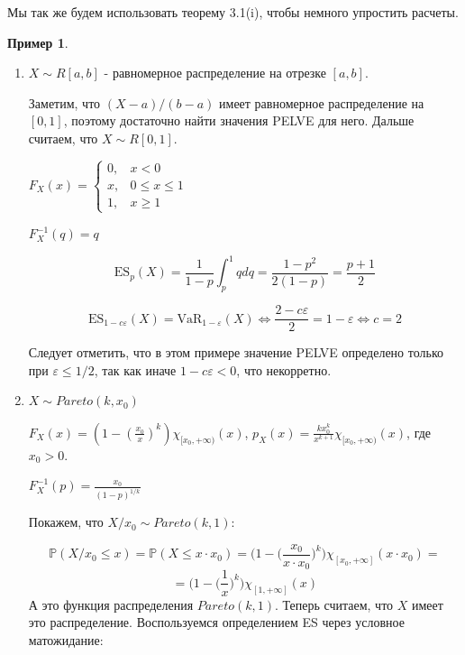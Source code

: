 \documentclass[12pt]{article}
\theoremstyle{plain}
\theoremstyle{definition}
\newtheorem{example}{Пример}[section]
\theoremstyle{remark}
\begin{document}
Мы так же будем использовать теорему 3.1(i), чтобы немного упростить расчеты. 

\begin{example}
$\text{}$
\begin{enumerate}
    \item $X \sim R[a, b]$ - равномерное распределение на отрезке $[a, b]$.

        Заметим, что $(X - a)/(b-a)$ имеет равномерное распределение на $[0,1]$, поэтому достаточно найти значения PELVE для него. Дальше считаем, что $X \sim R[0, 1]$.
    
        $F_X(x)=
        \begin{cases}
        0, &  x < 0 \\
        x, &  0 \leq x \leq 1 \\
        1, &  x \geq 1
        \end{cases}$
        
        $F_X^{-1}(q) = q$
    
        \[\text{ES}_p(X) = \frac{1}{1-p}\int_p^1qdq = \frac{1-p^2}{2(1-p)} = \frac{p+1}{2}\]
    
        \begin{equation*}
        \text{ES}_{1-c\varepsilon}(X) = \text{VaR}_{1-\varepsilon}(X) \iff \frac{2 -c\varepsilon}{2} = 1 - \varepsilon \iff c = 2
        \end{equation*}

        Следует отметить, что в этом примере значение PELVE определено только при $\varepsilon \leq 1/2$, так как иначе $1-c\varepsilon < 0$, что некорретно.

    
    
    \item $X \sim Pareto(k, x_0)$

        $F_X(x) = (1 -(\frac{x_0}{x})^k)\chi_{[x_0,+\infty)}(x)$, $p_X(x)= \frac{kx_0^k}{x^{k+1}}\chi_{[x_0,+\infty)}(x)$, где $x_0 > 0$.
    
        $F_X^{-1}(p) = \frac{x_0}{(1-p)^{1/k}}$

        Покажем, что $X/x_0 \sim Pareto(k, 1)$:

        \[
            \mathbb{P}(X/x_0 \leq x ) = \mathbb{P}(X \leq x\cdot x_0) = \bigg(1-\bigg(\frac{x_0}{x \cdot x_0}\bigg)^k\bigg) \chi_{[x_0,+\infty]}(x\cdot x_0) = 
        \]
        \[
            = \bigg(1-\bigg(\frac{1}{x}\bigg)^k\bigg) \chi_{[1,+\infty]}(x)
        \]
        А это функция распределения $Pareto(k, 1)$. Теперь считаем, что $X$ имеет это распределение. Воспользуемся определением ES через условное матожидание:
        

\end{enumerate}
\end{example}
\end{document}
